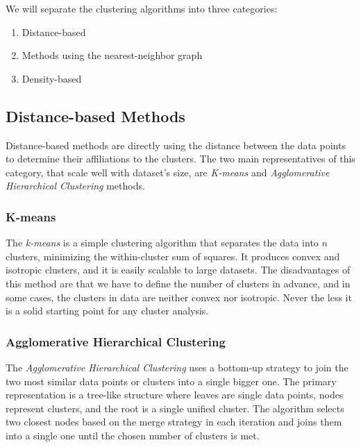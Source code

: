 We will separate the clustering algorithms into three categories:
\begin{enumerate}
    \item Distance-based
    \item Methods using the nearest-neighbor graph
    \item Density-based
\end{enumerate}

\subsection{Distance-based Methods}
Distance-based methods are directly using the distance between the data points to determine their affiliations to the clusters. The two main representatives of this category, that scale well  with dataset's size, are \textit{K-means} and \textit{Agglomerative Hierarchical Clustering} methods.

\subsubsection{K-means}
The \textit{k-means} \cite{vis:kmeans} is a simple clustering algorithm that separates the data into $n$ clusters, minimizing the within-cluster sum of squares. It produces convex and isotropic clusters, and it is easily scalable to large datasets. The disadvantages of this method are that we have to define the number of clusters in advance, and in some cases, the clusters in data are neither convex nor isotropic. Never the less it is a solid starting point for any cluster analysis. 

\subsubsection{Agglomerative Hierarchical Clustering}
The \textit{Agglomerative Hierarchical Clustering} \cite{vis:agg-cluster, vis:kmeans} uses a bottom-up strategy to join the two most similar data points or clusters into a single bigger one. The primary representation is a tree-like structure where leaves are single data points, nodes represent clusters, and the root is a single unified cluster. The algorithm selects two closest nodes based on the merge strategy in each iteration and joins them into a single one until the chosen number of clusters is met.

